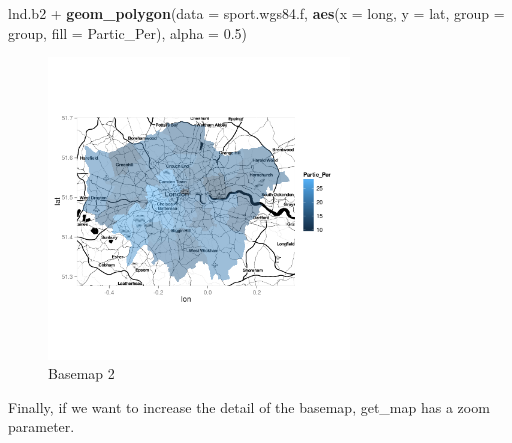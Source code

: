 \documentclass[]{article}
\newenvironment{Shaded}{}{}
\newcommand{\KeywordTok}[1]{\textcolor[rgb]{0.00,0.44,0.13}{\textbf{{#1}}}}
\newcommand{\DataTypeTok}[1]{\textcolor[rgb]{0.56,0.13,0.00}{{#1}}}
\newcommand{\FloatTok}[1]{\textcolor[rgb]{0.25,0.63,0.44}{{#1}}}
\newcommand{\NormalTok}[1]{{#1}}
\begin{document}
\begin{Shaded}
\begin{Highlighting}[]
\NormalTok{lnd.b2 + }\KeywordTok{geom_polygon}\NormalTok{(}\DataTypeTok{data =} \NormalTok{sport.wgs84.f, }\KeywordTok{aes}\NormalTok{(}\DataTypeTok{x =} \NormalTok{long, }\DataTypeTok{y =} \NormalTok{lat, }\DataTypeTok{group =} \NormalTok{group, }
    \DataTypeTok{fill =} \NormalTok{Partic_Per), }\DataTypeTok{alpha =} \FloatTok{0.5}\NormalTok{)}
\end{Highlighting}
\end{Shaded}
\begin{figure}[htbp]
\centering
\includegraphics[width=8cm]{figure/Basemap_2.png}
\caption{Basemap 2}
\end{figure}

Finally, if we want to increase the detail of the basemap, get\_map has
a zoom parameter.
\end{document}

